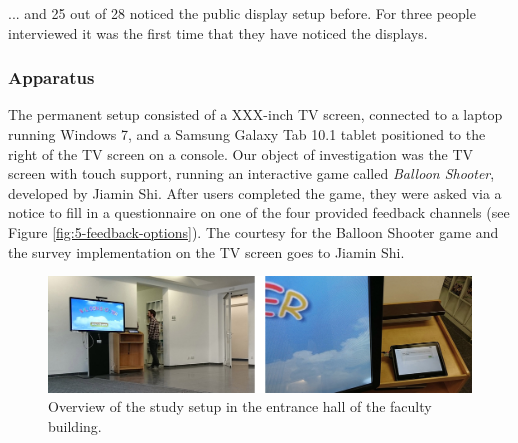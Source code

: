 		... and 25 out of 28 noticed the public display setup before. For three people interviewed it was the first time that they have noticed the displays.




	\subsubsection{Apparatus}
	\label{sec:field-study:apparatus}

		The permanent setup consisted of a XXX-inch TV screen, connected to a laptop running Windows 7, and a Samsung Galaxy Tab 10.1 tablet positioned to the right of the TV screen on a console. Our object of investigation was the TV screen with touch support, running an interactive game called \textit{Balloon Shooter}, developed by Jiamin Shi. After users completed the game, they were asked via a notice to fill in a questionnaire on one of the four provided feedback channels (see Figure \ref{fig:5-feedback-options}). The courtesy for the Balloon Shooter game and the survey implementation on the TV screen goes to Jiamin Shi.

		\begin{figure}
		    \begin{center}
   \includegraphics[width=\columnwidth]{img/5_field-study/study-setup.jpg}
		    \end{center}
		 \caption{Overview of the study setup in the entrance hall of the faculty building.}
		 \label{fig:5-study-setup}
		\end{figure}

